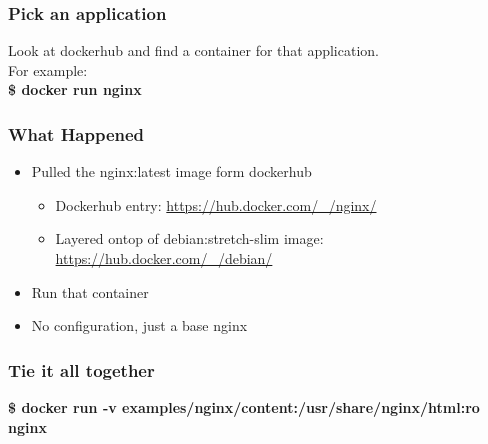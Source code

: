 \documentclass[aspectratio=169,11pt,hyperref={colorlinks=true}]{beamer}
\begin{document}
\begin{frame}
    \frametitle{Pick an application}
    Look at dockerhub and find a container for that application. \\
    For example:\\
    \textbf{\$ docker run nginx}
\end{frame}

\begin{frame}
    \frametitle{What Happened}
    \begin{itemize}
        \item Pulled the nginx:latest image form dockerhub
            \begin{itemize}
                \item Dockerhub entry: \href{https://hub.docker.com/\_/nginx/}{https://hub.docker.com/\_/nginx/}
                \item Layered ontop of debian:stretch-slim image: \href{https://hub.docker.com/\_/debian/}{https://hub.docker.com/\_/debian/}
            \end{itemize}
        \item Run that container
        \item No configuration, just a base nginx
    \end{itemize}
\end{frame}

\begin{frame}
    \frametitle{Tie it all together}
    \textbf{\$ docker run -v examples/nginx/content:/usr/share/nginx/html:ro nginx}
\end{frame}
\end{document}

